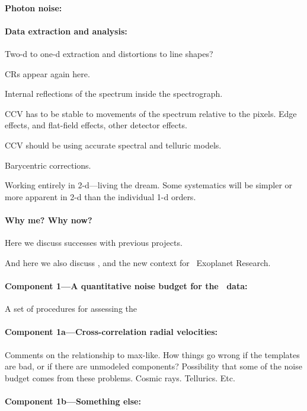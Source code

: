\documentclass[12pt, fullpage, letterpaper]{article}
\begin{document}
\paragraph{Photon noise:}

\paragraph{Data extraction and analysis:}
Two-d to one-d extraction and distortions to line shapes?

CRs appear again here.

Internal reflections of the spectrum inside the spectrograph.

CCV has to be stable to movements of the spectrum relative to the
pixels. Edge effects, and flat-field effects, other detector effects.

CCV should be using accurate spectral and telluric models.

Barycentric corrections.

Working entirely in 2-d---living the dream. Some systematics will be
simpler or more apparent in 2-d than the individual 1-d orders.

\paragraph{Why me? Why now?}
Here we discuss successes with previous projects.

And here we also discuss \NNEXPLORE, and the new context for
\NASA\ Exoplanet Research.

\paragraph{Component 1---A quantitative noise budget for the \HARPS\ data:}
A set of procedures for assessing the 

\paragraph{Component 1a---Cross-correlation radial velocities:}
Comments on the relationship to max-like. How things go wrong
if the templates are bad, or if there are unmodeled components?
Possibility that some of the noise budget comes from these
problems. Cosmic rays. Tellurics. Etc.

\paragraph{Component 1b---Something else:}
\end{document}
